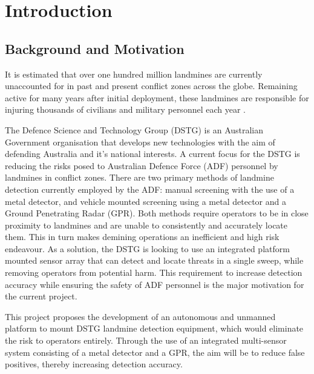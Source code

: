 \documentclass[main.tex]{subfiles}
\begin{document}

\chapter{Introduction}
\section{Background and Motivation}

It is estimated that over one hundred million landmines are currently unaccounted for in past and present conflict zones across the globe. Remaining active for many years after initial deployment, these landmines are responsible for injuring thousands of civilians and military personnel each year \parencite{landmineMonitor2015}.

The Defence Science and Technology Group (DSTG) is an Australian Government organisation that develops new technologies with the aim of defending Australia and it's national interests. A current focus for the DSTG is reducing the risks posed to Australian Defence Force (ADF) personnel by landmines in conflict zones. There are two primary methods of landmine detection currently employed by the ADF: manual screening with the use of a metal detector, and vehicle mounted screening using a metal detector and a Ground Penetrating Radar (GPR). Both methods require operators to be in close proximity to landmines and are unable to consistently and accurately locate them. This in turn makes demining operations an inefficient and high risk endeavour. 
As a solution, the DSTG is looking to use an integrated platform mounted sensor array that can detect and locate threats in a single sweep, while removing operators from potential harm. This requirement to increase detection accuracy while ensuring the safety of ADF personnel is the major motivation for the current project.


This project proposes the development of an autonomous and unmanned platform to mount DSTG landmine detection equipment, which would eliminate the risk to operators entirely. Through the use of an integrated multi-sensor system consisting of a metal detector and a GPR, the aim will be to reduce false positives, thereby increasing detection accuracy.
\end{document}
